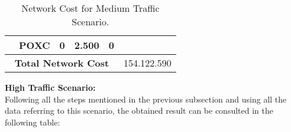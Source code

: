 \begin{table}[H]
\begin{tabular}{|c|c|c|c|c|c|c|}
                                    & \multicolumn{2}{c|}{\textbf{POXC}}                  & 0                 & 2.500               & 0             &                              \\ \hline
\multicolumn{6}{|c|}{\textbf{Total Network Cost}}                                                                                                   & 154.122.590                  \\ \hline
\end{tabular}
\caption{Network Cost for Medium Traffic Scenario.}
\end{table}

\textbf{High Traffic Scenario:}\\

Following all the steps mentioned in the previous subsection and using all the data referring to this scenario, the obtained result can be consulted in the following table:

